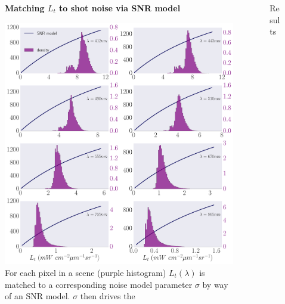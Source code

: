 \documentclass[final]{beamer}
\newlength{\sepwid}
\newlength{\onecolwid}
\newlength{\twocolwid}
\begin{document}
\begin{frame}[t]
\begin{columns}[t]
\begin{column}{\onecolwid}
\begin{figure}
\centering
\textbf{Matching $L_t$ to shot noise via SNR model}\par\medskip
\includegraphics[width=1.0\linewidth]{snrmodelLong.pdf}
\\{For each pixel in a scene (purple histogram) $L_t(\lambda)$  is matched to a  corresponding noise  model parameter $\sigma$ by way of an SNR model. $\sigma$ then drives the}
\end{figure}


\end{column} %


\begin{column}{\twocolwid} %
\begin{block}{Results}


\end{block}
\end{column}
\end{columns}
\end{frame}
\end{document}
